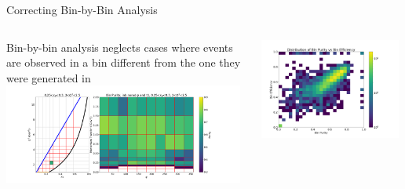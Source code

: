 \documentclass[aspectratio=169]{beamer}
\begin{document}
\begin{frame}{Correcting  Bin-by-Bin Analysis}

    \begin{columns}
        Bin-by-bin analysis neglects cases where events are observed in a bin different from the one they were generated in
        \includegraphics[width=0.98\textwidth]{Main/ibu/purities/bin_purity_0.25_0.3_2_2.5}

    \includegraphics[width=0.98\textwidth]{Main/ibu/overview/t1_bin_purity_vs_bin_efficiency}

    \end{columns}
    
\end{frame}
\end{document}
